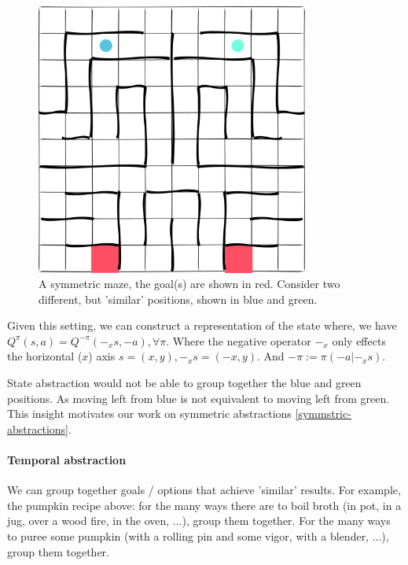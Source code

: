 \begin{figure}[h!]
\centering
\includegraphics[width=0.8\textwidth,height=0.4\textheight]{../../pictures/drawings/maze.png}
\caption{A symmetric maze, the goal(s) are shown in red.
Consider two different, but 'similar' positions, shown in blue and green.}
\end{figure}

Given this setting, we can construct a representation of the state \footnotemark[11] where,
we have $Q^{\pi}(s, a) = Q^{-\pi}(-_xs, -a), \forall \pi$.
Where the negative operator $-_x$ only effects the horizontal ($x$) axis $s = (x, y), -_xs = (-x, y)$.
And $-\pi := \pi(-a|-_xs)$.


State abstraction would not be able to group together the blue and green positions.
As moving left from blue is not equivalent to moving left from green.
This insight motivates our work on symmetric abstractions \ref{symmstric-abstractions}.

\paragraph{Temporal abstraction}

We can group together goals / options that achieve 'similar' results.
For example, the pumpkin recipe above: for the many ways there are to boil broth
(in pot, in a jug, over a wood fire, in the oven, ...), group them together.
For the many ways to puree some pumpkin (with a rolling pin and some vigor, with a blender, ...), group them together.


